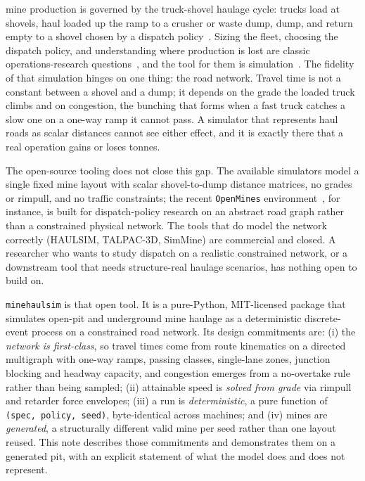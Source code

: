 \documentclass[journal]{IEEEtran}
\begin{document}
 mine production is governed by the truck-shovel haulage cycle: trucks load at shovels,
haul loaded up the ramp to a crusher or waste dump, dump, and return empty to a shovel chosen by a dispatch
policy~\cite{alarie,newman}. Sizing the fleet, choosing the dispatch policy, and understanding where production
is lost are classic operations-research questions~\cite{burt}, and the tool for them is
simulation~\cite{robinson}. The fidelity of that simulation hinges on one thing: the road network. Travel time is
not a constant between a shovel and a dump; it depends on the grade the loaded truck climbs and on congestion,
the bunching that forms when a fast truck catches a slow one on a one-way ramp it cannot pass. A simulator that
represents haul roads as scalar distances cannot see either effect, and it is exactly there that a real operation
gains or loses tonnes.

The open-source tooling does not close this gap. The available simulators model a single fixed mine layout with
scalar shovel-to-dump distance matrices, no grades or rimpull, and no traffic constraints; the recent
\texttt{OpenMines} environment~\cite{openmines}, for instance, is built for dispatch-policy research on an
abstract road graph rather than a constrained physical network. The tools that do model the network correctly
(HAULSIM, TALPAC-3D, SimMine) are commercial and closed. A researcher who wants to study dispatch on a realistic
constrained network, or a downstream tool that needs structure-real haulage scenarios, has nothing open to build
on.

\texttt{minehaulsim} is that open tool. It is a pure-Python, MIT-licensed package that simulates open-pit and
underground mine haulage as a deterministic discrete-event process on a constrained road network. Its design
commitments are: (i) the \emph{network is first-class}, so travel times come from route kinematics on a directed
multigraph with one-way ramps, passing classes, single-lane zones, junction blocking and headway capacity, and
congestion emerges from a no-overtake rule rather than being sampled; (ii) attainable speed is \emph{solved from
grade} via rimpull and retarder force envelopes; (iii) a run is \emph{deterministic}, a pure function of
\texttt{(spec, policy, seed)}, byte-identical across machines; and (iv) mines are \emph{generated}, a
structurally different valid mine per seed rather than one layout reused. This note describes those commitments
and demonstrates them on a generated pit, with an explicit statement of what the model does and does not
represent.
\end{document}
